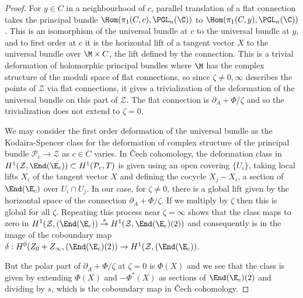 \begin{proof} For $y\in C$ in a neighbourhood of $c$,  parallel translation of a flat connection  takes the principal bundle $\Hom(\pi_1(C,c), \PGL_n(\C))$ to $\Hom(\pi_1(C,y), \PGL_n(\C))$. This is an isomorphism  of the universal bundle at $c$ to the universal bundle at $y$, and to first order at $c$ it is the horizontal lift of a tangent vector $X$ to the universal bundle over $\M\times C$, the lift defined by the connection. This is a trivial deformation of holomorphic  principal bundles where $\M$ has the complex structure of the moduli space of flat connections, so since $\zeta\ne 0,\infty$ describes the points of ${\mathcal Z}$ via flat connections, it gives a trivialization of the deformation of the universal bundle on this part of ${\mathcal Z}$. The flat connection is $\partial _A+ \Phi/\zeta$ and so the trivialization does not extend to $\zeta=0$.

	We may consider the first order deformation of the universal bundle as the Kodaira-Spencer class for the deformation of complex structure of the principal bundle ${\mathcal P}_c\rightarrow {\mathcal Z}$ as $c\in C$ varies.
	In \v Cech cohomology, the deformation class in $H^1({\mathcal Z},\End (\E_c))\subset H^1({\mathcal P}_c, T)$ is given using an open covering  $\{U_i\}$, taking  local lifts $X_i$ of the tangent vector $X$ and defining the cocycle $X_j-X_i$, a section of $\End (\E_c)$ over $U_i\cap U_j$. In our case, for $\zeta\ne 0$, there is a global lift given by the horizontal space of the connection $\partial _A+ \Phi/\zeta$. If we multiply by $\zeta$ then this is global for all $\zeta$. Repeating this process near $\zeta=\infty$ shows that the class maps to zero in $H^1({\mathcal Z},(\End (\E_c))\stackrel {s} \rightarrow H^1({\mathcal Z},\End (\E_c)(2))$ and consequently is in the image of the coboundary map $\delta:
	H^0({Z_0+Z_{\infty}},(\End (\E_c)(2))\rightarrow H^1({\mathcal Z},(\End (\E_c))$.

	But the polar part of $\partial _A+ \Phi/\zeta$ at $\zeta=0$ is $\Phi(X)$ and
	we see that the class is given by extending $\Phi(X)$ and $-\Phi^*(X)$ as sections of $\End (\E_c)(2)$ and dividing by $s$, which is the coboundary map  in \v{C}ech cohomology.
\end{proof}
